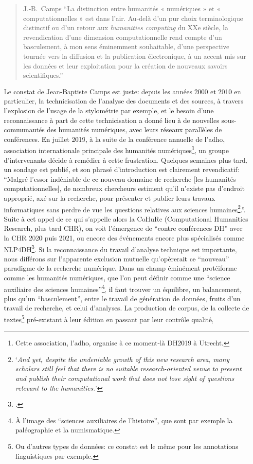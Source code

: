 \begin{quote}{J.-B.~Camps}
\enquote{La distinction entre humanités « numériques » et « computationnelles » est dans l’air. Au‑delà d’un pur choix terminologique distinctif ou d’un retour aux \textit{humanities computing} du XXe siècle, la revendication d’une dimension computationnelle rend compte d’un basculement, à mon sens éminemment souhaitable, d’une perspective tournée vers la diffusion et la publication électronique, à un accent mis sur les données et leur exploitation pour la création de nouveaux savoirs scientifiques.}\footnotemark
\end{quote}

Le constat de Jean-Baptiste Camps est juste: depuis les années 2000 et 2010 en particulier, la technicisation de l'analyse des documents et des sources, à travers l'explosion de l'usage de la stylométrie par exemple, et le besoin d'une reconnaissance à part de cette technicisation a donné lieu à de nouvelles sous-communautés des humanités numériques, avec leurs réseaux parallèles de conférences. En juillet 2019, à la suite de la conférence annuelle de l'\acrfull{adho}, association internationale principale des humanités numériques\footnote{Cette association, l'\acrshort{adho}, organise à ce moment-là DH2019 à Utrecht.}, un groupe d'intervenants décide à remédier à cette frustration. Quelques semaines plus tard, un sondage est publié, et son phrasé d'introduction est clairement revendicatif: \enquote{Malgré l'essor indéniable de ce nouveau domaine de recherche [les humanités computationnelles], de nombreux chercheurs estiment qu'il n'existe pas d'endroit approprié, axé sur la recherche, pour présenter et publier leurs travaux informatiques sans perdre de vue les questions relatives aux sciences humaines\footnote{\enquote{\textit{And yet, despite the undeniable growth of this new research area, many scholars still feel that there is no suitable research-oriented venue to present and publish their computational work that does not lose sight of questions relevant to the humanities.}}\textcite{noauthor_computational_nodate}}.}. Suite à cet appel de ce qui s'appelle alors la CoHuRe (Computational Humanities Research, plus tard CHR), on voit l'émergence de \enquote{contre conférences DH} avec la CHR 2020 puis 2021, ou encore des événements encore plus spécialisés comme NLP4DH\footcite{noauthor_workshop_nodate}. Si la reconnaissance du travail d'analyse technique est importante, nous différons sur l'apparente exclusion mutuelle qu'opèrerait ce \enquote{nouveau} paradigme de la recherche numérique. Dans un champ éminément protéiforme comme les humanités numériques, que l'on peut définir comme une \enquote{science auxiliaire des sciences humaines}\footnote{À l'image des \enquote{sciences auxiliaires de l'histoire}, que sont par exemple la paléographie et la numismatique.}, il faut trouver un équilibre, un balancement, plus qu'un \enquote{basculement}, entre le travail de génération de données, fruits d'un travail de recherche, et celui d'analyses. La production de corpus, de la collecte de textes\footnote{Ou d'autres types de données: ce constat est le même pour les annotations linguistiques par exemple.} pré-existant à leur édition en passant par leur contrôle qualité, 